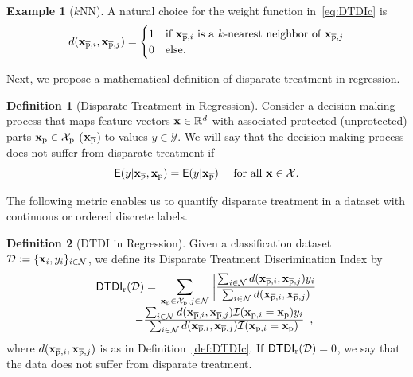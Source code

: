 \documentclass[letterpaper]{article} %
\theoremstyle{definition}
\newtheorem{definition}{Definition}[section]
\newtheorem{example}{Example}[section]
\newcommand{\1}{\ensuremath{{\rm e}}} %
\newcommand{\E}{\ensuremath{\mathsf{E}}} %
\newcommand{\uprx}{{\bf x}_{\overline{\rm p}}}
\newcommand{\prx}{{\bf x}_{\rm p}}
\newcommand{\uprxi}{{\bf{x}}_{\overline{\rm{p}},i}}
\newcommand{\prxi}{{\bf{x}}_{{\rm{p}},i}}
\newcommand{\uprxj}{{\bf{x}}_{\overline{\rm{p}},j}}
\newcommand{\prX}{{\mathcal X}_{\rm p}}
\begin{document}
\begin{example}[$k$NN]
A natural choice for the weight function in~\eqref{eq:DTDIc} is
$$
d( \uprxi, \uprxj ) = \begin{cases}
1 & \text{if } \uprxi \text{ is a $k$-nearest neighbor of $\uprxj$} \\
0 & \text{else}.
\end{cases}
$$
\end{example}

Next, we propose a mathematical definition of disparate treatment in regression.
\begin{definition}[Disparate Treatment in Regression] Consider a decision-making process that maps feature vectors ${\bf x} \in \mathbb R^d$ with associated protected (unprotected) parts $\prx \in \prX$ ($\uprx$) to values $y \in \mathcal Y$. We will say that the decision-making process does not suffer from disparate treatment if
$$
\E( y |  \uprx, \prx ) = \E( y | \uprx ) \quad \text{ for all } {\bf x} \in \mathcal X.
$$
\end{definition}

The following metric enables us to quantify disparate treatment in a dataset with continuous or ordered discrete labels.
\begin{definition}[DTDI in Regression]
Given a classification dataset $\mathcal D:= \{ {\bf x}_i, y_i \}_{i\in \mathcal N}$, we define its Disparate Treatment Discrimination Index by
\begin{equation}
\begin{array}{ccl}
{\mathsf{DTDI}}_{\rm r}({\mathcal D}) = 
\displaystyle \sum_{\begin{smallmatrix} \prx \in \prX ,j \in \mathcal N \end{smallmatrix}} 
\left| 
\frac{ \textstyle  \sum_{i \in \mathcal N} d( \uprxi, \uprxj ) y_i  }
{ \textstyle  \sum_{i \in \mathcal N} d( \uprxi, \uprxj ) }
\right. \\
\left. \qquad \quad  -
\frac{ \textstyle \sum_{i \in \mathcal N} d( \uprxi, \uprxj ) \mathcal I (\prxi = \prx ) y_i  }
{ \textstyle  \sum_{i \in \mathcal N} d( \uprxi, \uprxj ) \mathcal I (\prxi = \prx ) } 
\right|,
\end{array}
\label{eq:DTDIr}
\end{equation}
where $d(\uprxi, \uprxj)$ is as in Definition~\ref{def:DTDIc}. If ${\mathsf{DTDI}}_{\rm r}({\mathcal D}) = 0$, we say that the data does not suffer from disparate treatment.
\label{def:DTDIr}
\end{definition}
\end{document}
